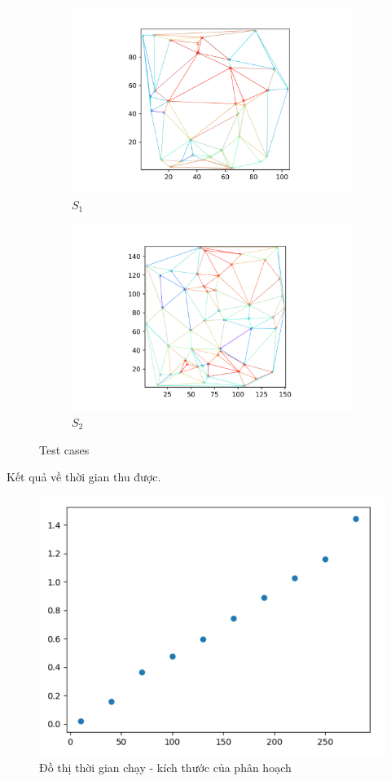 \documentclass[15pt]{article}
\begin{document}
{\begin{figure}
\begin{subfigure}{.5\textwidth}
  \centering
  \includegraphics[width=.8\linewidth]{./70_vertex_overlayp0.png}
  \caption{$S_1$}
  \label{fig:sfig1}
\end{subfigure}%
\begin{subfigure}{.5\textwidth}
  \centering
  \includegraphics[width=.8\linewidth]{./100_vertex_overlayp0.png}
  \caption{$S_2$}
  \label{fig:sfig2}
\end{subfigure}

\caption{Test cases}
\label{fig:fig}
\end{figure}

Kết quả về thời gian thu được. \\

\begin{figure}[h!]
\centering
\includegraphics[scale=0.5]{./time.png}
\caption{Đồ thị thời gian chạy - kích thước của phân hoạch}
\label{fig: lala}
\end{figure}

}
\end{document}
